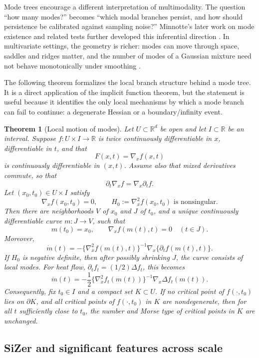 \documentclass[preprint]{imsart}
\theoremstyle{plain}
\newtheorem{theorem}{Theorem}[section]
\theoremstyle{definition}
\newcommand{\R}{\mathbb{R}}
\begin{document}
Mode trees encourage a different interpretation of multimodality. The question ``how many modes?'' becomes ``which modal branches persist, and how should persistence be calibrated against sampling noise?'' Minnotte's later work on mode existence and related tests further developed this inferential direction \citep{minnotte_1997_NonparametricTestingExistence}. In multivariate settings, the geometry is richer: modes can move through space, saddles and ridges matter, and the number of modes of a Gaussian mixture need not behave monotonically under smoothing \citep{carreira-perpinan_2003_NumberModesGaussian, ray_2005_TopographyMultivariateNormal}.

The following theorem formalizes the local branch structure behind a mode tree. It is a direct application of the implicit function theorem, but the statement is useful because it identifies the only local mechanisms by which a mode branch can fail to continue: a degenerate Hessian or a boundary/infinity event.

\begin{theorem}[Local motion of modes]
\label{thm:mode-motion}
Let $U\subset\R^d$ be open and let $I\subset\R$ be an interval.
Suppose $f:U\times I\to\R$ is twice continuously differentiable in $x$,
differentiable in $t$, and that
\[
  F(x,t)=\nabla_x f(x,t)
\]
is continuously differentiable in $(x,t)$. Assume also that mixed
derivatives commute, so that
\[
  \partial_t\nabla_x f=\nabla_x\partial_t f.
\]
Let $(x_0,t_0)\in U\times I$ satisfy
\[
  \nabla_x f(x_0,t_0)=0,
  \qquad
  H_0:=\nabla_x^2 f(x_0,t_0) \text{ is nonsingular}.
\]
Then there are neighborhoods $V$ of $x_0$ and $J$ of $t_0$, and a unique
continuously differentiable curve $m:J\to V$, such that
\[
  m(t_0)=x_0,
  \qquad
  \nabla_x f(m(t),t)=0
  \quad(t\in J).
\]
Moreover,
\[
  \dot m(t)
  =-\{\nabla_x^2 f(m(t),t)\}^{-1}
     \nabla_x\{\partial_t f(m(t),t)\}.
\]
If $H_0$ is negative definite, then after possibly shrinking $J$, the
curve consists of local modes. For heat flow,
\(\partial_t f_t=(1/2)\Delta f_t\), this becomes
\[
  \dot m(t)
  =-\frac12\{\nabla_x^2 f_t(m(t))\}^{-1}
    \nabla_x\Delta f_t(m(t)).
\]
Consequently, fix \(t_0\in I\) and a compact set \(K\subset U\). If no
critical point of \(f(\cdot,t_0)\) lies on \(\partial K\), and all
critical points of \(f(\cdot,t_0)\) in \(K\) are nondegenerate, then for
all \(t\) sufficiently close to \(t_0\), the number and Morse type of
critical points in \(K\) are unchanged.
\end{theorem}

\subsection{SiZer and significant features across scale}
\label{subsec:sizer}
\end{document}
